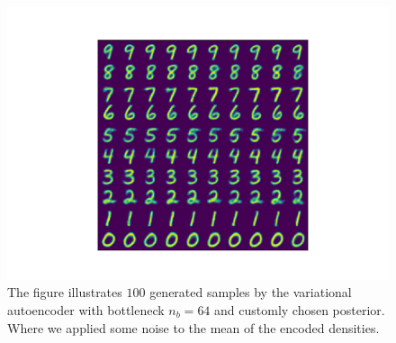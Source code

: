\begin{figure}
\begin{center}
   \begin{minipage}[b]{0.60\linewidth}
      \includegraphics[trim = 15mm 10mm 15mm 10mm, clip, width=\linewidth]{convolutional_VAE_new_idea_KL_4e-2_10k_epochs_64D_generated_optimal}
	\end{minipage}
\end{center}
\caption{The figure illustrates $100$ generated samples by the variational autoencoder with bottleneck $n_b=64$ and customly chosen posterior. Where we applied some noise to the mean of the encoded densities.}\label{fig:convolutional_VAE_better_generations_new_idea}
\end{figure}
